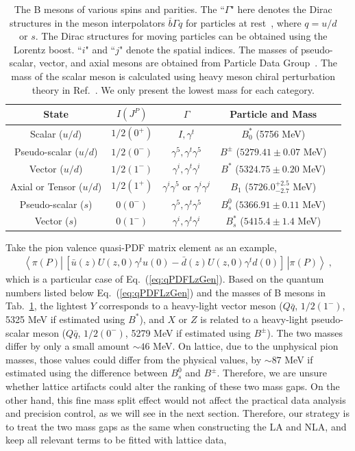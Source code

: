 \documentclass[a4paper,11pt]{article}
\begin{document}
\begin{table}[]
    \centering
    \begin{tabular}{|c|c|c|c|c|}
     \hline
     State & $I(J^{P})$ & $\Gamma$ & Particle and Mass  \\
     \hline
     Scalar ($u/d$) & $1/2(0^{+})$ & $I,\gamma^t$ & $B^{*}_{0}$ (5756 MeV) \\
     Pseudo-scalar ($u/d$) & $1/2(0^{-})$ & $\gamma^5,\gamma^t\gamma^5$ & $B^{\pm}$ ($5279.41\pm0.07$ MeV)  \\
     Vector ($u/d$) & $1/2(1^{-})$ & $\gamma^i,\gamma^t\gamma^i$ &  $B^{*}$ ($5324.75\pm0.20$ MeV) \\
     Axial or Tensor ($u/d$) & $1/2(1^{+})$ & $\gamma^i\gamma^5$ or $\gamma^i\gamma^j$ & $B_1$ ($5726.0^{+2.5}_{-2.7}$ MeV) \\
     Pseudo-scalar ($s$) & $0(0^{-})$ & $\gamma^5,\gamma^t\gamma^5$ & $B_s^{0}$ ($5366.91\pm0.11$ MeV)  \\
     Vector ($s$) & $0(1^{-})$ & $\gamma^i,\gamma^t\gamma^i$ &  $B_s^{*}$ ($5415.4\pm1.4$ MeV) \\
    \hline
    \end{tabular}
    \caption{The B mesons of various spins and parities. The ``$\Gamma$" here denotes the Dirac structures in the meson interpolators $\bar{b} \Gamma q$ for particles at rest~\cite{Gattringer:2010zz}, where $q=u/d$ or $s$. The Dirac structures for moving particles can be obtained using the Lorentz boost. ``$i$" and ``$j$" denote the spatial indices. The masses of pseudo-scalar, vector, and axial mesons are obtained from Particle Data Group~\cite{ParticleDataGroup:2024cfk}. The mass of the scalar meson is calculated using heavy meson chiral perturbation theory in Ref.~\cite{Cheng:2017oqh}. We only present the lowest mass for each category. }
    \label{tab:Bmesons}
\end{table}
Take the pion valence quasi-PDF matrix element as an example, 
\begin{align}
\left\langle \pi(P) \left| \, \left[ \bar{u}(z) U(z,0) \gamma^t u(0) - \bar{d}(z) U(z,0) \gamma^t d(0) \right] \, \right| \pi(P) \right\rangle \ ,
\end{align}
which is a particular case of Eq.~(\ref{eq:qPDFLzGen}). Based on the quantum numbers listed below Eq.~(\ref{eq:qPDFLzGen}) and the masses of B mesons in Tab.~\ref{tab:Bmesons}, the lightest $Y$ corresponds to a heavy-light vector meson ($Q\bar{q}$, $1/2(1^{-})$, 5325 MeV if estimated using $B^{*}$), and $X$ or $Z$ is related to a heavy-light pseudo-scalar meson ($Q\bar{q}$, $1/2(0^{-})$, 5279 MeV if estimated using $B^{\pm}$). The two masses differ by only a small amount $\sim 46$ MeV. On lattice, due to the unphysical pion masses, those values could differ from the physical values, by $\sim 87$ MeV if estimated using the difference between $B_s^{0}$ and $B^{\pm}$. Therefore, we are unsure whether lattice artifacts could alter the ranking of these two mass gaps. On the other hand, this fine mass split effect would not affect the practical data analysis and precision control, as we will see in the next section. Therefore, our strategy is to treat the two mass gaps as the same when constructing the LA and NLA, and keep all relevant terms to be fitted with lattice data,
\end{document}
